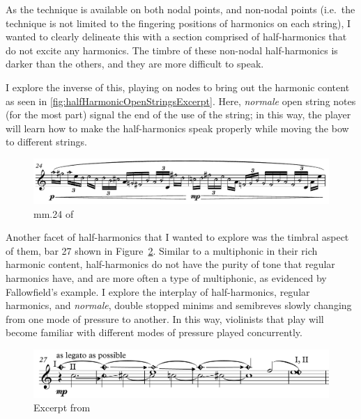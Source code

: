 As the technique is available on both nodal points, and non-nodal points (i.e.\ the technique is not limited to the fingering positions of harmonics on each string), I wanted to clearly delineate this with a section comprised of half-harmonics that do not excite any harmonics. 
The timbre of these non-nodal half-harmonics is darker than the others, and they are more difficult to speak.

I explore the inverse of this, playing on nodes to bring out the harmonic content as seen in \autoref{fig:halfHarmonicOpenStringsExcerpt}.
Here, \emph{normale} open string notes (for the most part) signal the end of the use of the string; in this way, the player will learn how to make the half-harmonics speak properly while moving the bow to different strings.

\begin{figure}
  \includegraphics[width=\linewidth]{./resources/halfHarmonicOpenStringsExcerpt.pdf}
  \caption{mm.\@ 24 of \violinPiece}\label{fig:halfHarmonicOpenStringsExcerpt}
\end{figure}

Another facet of half-harmonics that I wanted to explore was the timbral aspect of them, bar 27 shown in Figure~\ref{fig:violinHalfHarmonicsExcerpt27}.
Similar to a multiphonic in their rich harmonic content, half-harmonics do not have the purity of tone that regular harmonics have, and are more often a type of multiphonic, as evidenced by Fallowfield's example.\autocite[]{fallowfieldCelloMapHalf2013}
I explore the interplay of half-harmonics, regular harmonics, and \emph{normale}, double stopped minims and semibreves slowly changing from one mode of pressure to another.
In this way, violinists that play \violinPiece\space will become familiar with different modes of pressure played concurrently.

\begin{figure}
    \includegraphics[width=\linewidth]{./resources/violinHalfHarmonicsExcerpt27.pdf}
    \caption{Excerpt from \violinPiece}\label{fig:violinHalfHarmonicsExcerpt27}
  \end{figure}

